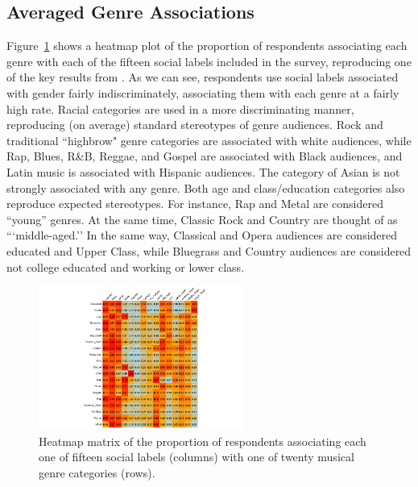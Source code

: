 \documentclass[12pt]{article}
\begin{document}
\subsection*{Averaged Genre Associations}
Figure~\ref{fig:main} shows a heatmap plot of the proportion of respondents associating each genre with each of the fifteen social labels included in the survey, reproducing one of the key results from \citet[Table 3]{lizardo2016cultural-aaa}. As we can see, respondents use social labels associated with gender fairly indiscriminately, associating them with each genre at a fairly high rate. Racial categories are used in a more discriminating manner, reproducing (on average) standard stereotypes of genre audiences. Rock and traditional ``highbrow" genre categories are associated with white audiences, while Rap, Blues, R\&B, Reggae, and Gospel are associated with Black audiences, and Latin music is associated with Hispanic audiences. The category of Asian is not strongly associated with any genre. Both age and class/education categories also reproduce expected stereotypes. For instance, Rap and Metal are considered ``young'' genres. At the same time, Classic Rock and Country are thought of as ```middle-aged.'' In the same way, Classical and Opera audiences are considered educated and Upper Class, while Bluegrass and Country audiences are considered not college educated and working or lower class. 

\begin{figure}[ht!]
    \centering
    \includegraphics[trim={7cm 0cm 6cm 0cm},clip, width=0.6\textwidth]{Plots/main.png}
    \caption{Heatmap matrix of the proportion of respondents associating each one of fifteen social labels (columns) with one of twenty musical genre categories (rows).}
    \label{fig:main}
\end{figure}
\end{document}
